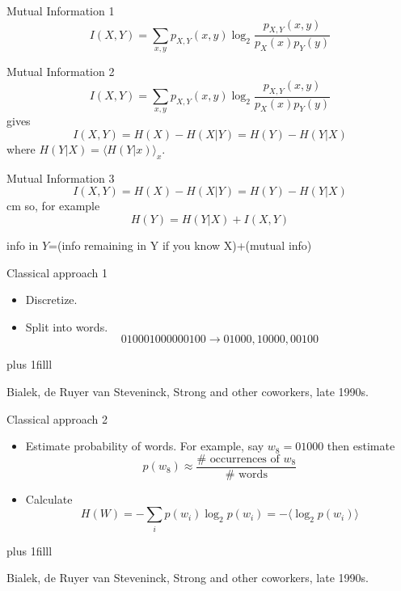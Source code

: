 \documentclass{beamer}
\newcommand{\btVFill}{\vskip0pt plus 1filll}
\begin{document}
\begin{frame}{Mutual Information 1}
\color{dark}
$$
I(X,Y)=\sum_{x,y} p_{X,Y}(x,y) \log_2{\frac{p_{X,Y}(x,y)}{p_X(x)p_Y(y)}}
$$
\color{black}
\end{frame}


\begin{frame}{Mutual Information 2}
\color{dark}
$$
I(X,Y)=\sum_{x,y} p_{X,Y}(x,y) \log_2{\frac{p_{X,Y}(x,y)}{p_X(x)p_Y(y)}}
$$
\color{black}
gives
\color{dark}
$$
I(X,Y)=H(X)-H(X|Y)=H(Y)-H(Y|X)
$$
\color{black}
where $H(Y|X)=\langle H(Y|x)\rangle_x$.
\end{frame}


\begin{frame}{Mutual Information 3}
\color{dark}
$$
I(X,Y)=H(X)-H(X|Y)=H(Y)-H(Y|X)
$$
\color{black}
 cm
so, for example
\color{dark}
$$
H(Y)=H(Y|X)+I(X,Y)
$$
\color{black}
\begin{center}
info in $Y$=(info remaining in Y if you know X)+(mutual info)
\end{center}
\end{frame}


\begin{frame}{Classical approach 1}
\begin{itemize}
\item Discretize.
\color{reddish}
\begin{center}

\end{center}
\color{black}
\item Split into words.
\color{dark}
$$010001000000100\rightarrow 01000,10000,00100$$
\color{black}
\end{itemize}
\btVFill
\begin{flushright}
\tiny{Bialek, de Ruyer van Steveninck, Strong and other coworkers, late 1990s.}
\end{flushright}
\end{frame}

\begin{frame}{Classical approach 2}
\begin{itemize}
\item Estimate probability of words. For example, say $w_8=01000$ then estimate
\color{dark}
$$p(w_8)\approx\frac{\#\mbox{ occurrences of }w_8}{\#\mbox{ words}}$$ 
\color{black}
\item Calculate
\color{dark}
$$H(W)=-\sum_i p(w_i)\log_2 p(w_i) =-\langle\log_2 p(w_i)\rangle$$ 
\color{black}
\end{itemize}
\btVFill
\begin{flushright}
\tiny{Bialek, de Ruyer van Steveninck, Strong and other coworkers, late 1990s.}
\end{flushright}
\end{frame}
\end{document}
